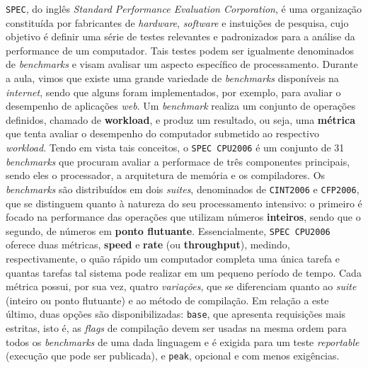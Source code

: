 \documentclass[12pt]{article}
\begin{document}
\texttt{SPEC}, do inglês \textit{Standard Performance Evaluation Corporation}, é
uma organização constituída por fabricantes de \textit{hardware},
\textit{software} e instuições de pesquisa, cujo objetivo é definir uma série de
testes relevantes e padronizados para a análise da performance de um computador.
Tais testes podem ser igualmente denominados de \textit{benchmarks} e visam
avalisar um aspecto específico de processamento. Durante a aula, vimos que
existe uma grande variedade de \textit{benchmarks} disponíveis na
\textit{internet}, sendo que alguns foram implementados, por exemplo, para
avaliar o desempenho de aplicações \textit{web}. Um \textit{benchmark} realiza
um conjunto de operações definidos, chamado de \textbf{workload}, e produz um
resultado, ou seja, uma \textbf{métrica} que tenta avaliar o desempenho do
computador submetido ao respectivo \textit{workload}. Tendo em vista tais
conceitos, o \texttt{SPEC CPU2006} é um conjunto de 31 \textit{benchmarks} que
procuram avaliar a performace de três componentes principais, sendo eles o
processador, a arquitetura de memória e os compiladores. Os \textit{benchmarks}
são distribuídos em dois \textit{suites}, denominados de \texttt{CINT2006} e
\texttt{CFP2006}, que se distinguem quanto à natureza do seu processamento
intensivo: o primeiro é focado na performance das operações que utilizam números
\textbf{inteiros}, sendo que o segundo, de números em \textbf{ponto flutuante}.
Essencialmente, \texttt{SPEC CPU2006} oferece duas métricas, \textbf{speed} e
\textbf{rate} (ou \textbf{throughput}), medindo, respectivamente, o quão rápido
um computador completa uma única tarefa e quantas tarefas tal sistema pode
realizar em um pequeno período de tempo. Cada métrica possui, por sua vez,
quatro \textit{variações}, que se diferenciam quanto ao \textit{suite} (inteiro ou
ponto flutuante) e ao método de compilação. Em relação a este último, duas
opções são disponibilizadas: \texttt{base}, que apresenta requisições mais
estritas, isto é, as \textit{flags} de compilação devem ser usadas na mesma
ordem para todos os \textit{benchmarks} de uma dada linguagem e é exigida para
um teste \textit{reportable} (execução que pode ser publicada), e \texttt{peak}, opcional
e com menos exigências.
\end{document}
